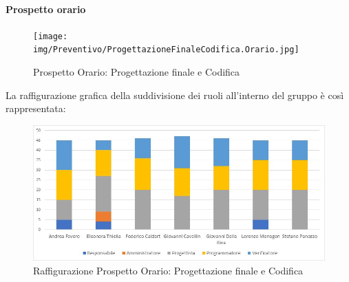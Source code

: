 \paragraph{Prospetto orario}
\begin{figure}[h!]
	\centerline{\texttt{[image: img/Preventivo/ProgettazioneFinaleCodifica.Orario.jpg]}}
	\caption{Prospetto Orario: Progettazione finale e Codifica}
\end{figure}
La raffigurazione grafica della suddivisione dei ruoli all'interno del gruppo è così rappresentata: 
\begin{figure}[h!]
	\centerline{\includegraphics[scale=0.4]{img/Preventivo/Istogrammi/ProgettazioneFinaleCodifica.jpg}}
	\caption{Raffigurazione Prospetto Orario: Progettazione finale e Codifica}
\end{figure}
